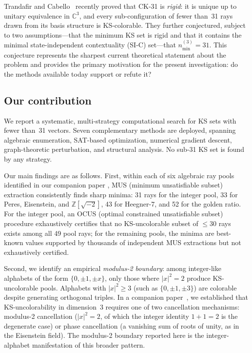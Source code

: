 \documentclass[twocolumn,pra,superscriptaddress,nofootinbib]{revtex4-2}
\newcommand{\C}{\mathbb{C}}
\newcommand{\Z}{\mathbb{Z}}
\begin{document}
Trandafir and Cabello~\cite{TrandafirCabello2025} recently proved that CK-31 is
\emph{rigid}: it is unique up to unitary equivalence in $\C^3$, and every
sub-configuration of fewer than~31 rays drawn from its basis structure is
KS-colorable. They further conjectured, subject to two assumptions---that the minimum KS set is rigid and that it contains the minimal state-independent contextuality (SI-C) set---that $n_{\min}^{(3)} = 31$. This conjecture represents the sharpest current
theoretical statement about the problem and provides the primary motivation for
the present investigation: do the methods available today support or refute it?

\subsection*{Our contribution}

We report a systematic, multi-strategy computational search for KS sets with
fewer than~31 vectors. Seven complementary methods are deployed, spanning
algebraic enumeration, SAT-based optimization, numerical gradient descent,
graph-theoretic perturbation, and structural analysis. No sub-31 KS set is
found by any strategy.

Our main findings are as follows. First, within each of six algebraic ray pools
identified in our companion paper \cite{Kernaghan2026algebraic}, MUS (minimum
unsatisfiable subset) extraction consistently finds sharp minima: 31 rays for the
integer pool, 33 for Peres, Eisenstein, and $\Z[\sqrt{-2}]$, 43 for Heegner-7,
and 52 for the golden ratio. For the integer pool, an OCUS (optimal constrained
unsatisfiable subset) procedure exhaustively certifies that no KS-uncolorable
subset of $\leq 30$ rays exists among all 49 pool rays; for the remaining pools,
the minima are best-known values supported by thousands of independent MUS
extractions but not exhaustively certified.

Second, we identify an empirical \emph{modulus-2 boundary}: among
integer-like alphabets of the form $\{0,\pm 1,\pm x\}$, only those where
$|x|^2 = 2$ produce KS-uncolorable pools. Alphabets with $|x|^2 \geq 3$
(such as $\{0,\pm 1,\pm 3\}$) are colorable despite generating orthogonal
triples. In a companion paper~\cite{Kernaghan2026algebraic}, we established
that KS-uncolorability in dimension~3 requires one of two cancellation
mechanisms: modulus-2 cancellation ($|x|^2 = 2$, of which the integer
identity $1+1=2$ is the degenerate case) or phase cancellation (a vanishing
sum of roots of unity, as in the Eisenstein field). The modulus-2 boundary
reported here is the integer-alphabet manifestation of this broader pattern.
\end{document}
